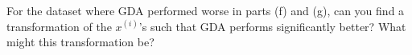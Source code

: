 \item {} For the dataset where GDA performed worse in parts (f) and (g), can you find a transformation of the $x^{(i)}$'s such that GDA performs significantly better? What might this transformation be?

